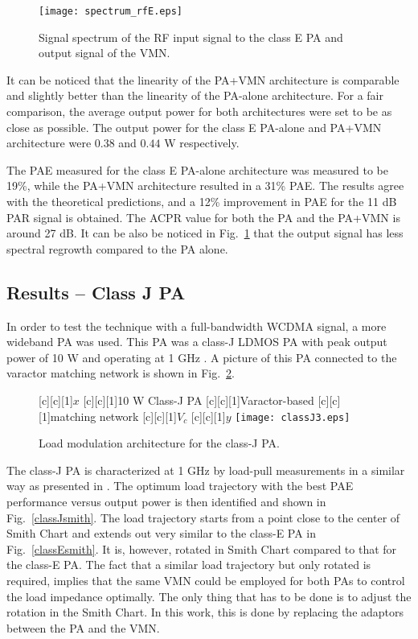 \documentclass[10pt,journal]{IEEEtran}
\begin{document}
\begin{figure}
\centering
\texttt{[image: spectrum\_rfE.eps]}
\caption{Signal spectrum of the RF input signal to the class E PA and output
signal of the VMN.}
\label{spct_rfE}
\end{figure}

It can be noticed that the linearity of the PA+VMN architecture is comparable and slightly better than the linearity of the PA-alone architecture. For a fair comparison, the average output power for both architectures were set to be as close as possible. The output power for the class E PA-alone and PA+VMN architecture were $0.38$ and $0.44$ W respectively.

The PAE measured for the class E PA-alone architecture was measured to be 19\%, while the PA+VMN architecture resulted in a 31\% PAE. The results agree with the theoretical predictions, and a 12\% improvement in PAE for the 11 dB PAR signal is obtained. The ACPR value for both the PA and the PA+VMN is around 27 dB. It can be also be noticed in Fig.~\ref{spct_rfE} that the output signal has less spectral regrowth compared to the PA alone.

\subsection{Results -- Class J PA}
In order to test the technique with a full-bandwidth WCDMA signal, a more wideband PA was used. This PA was a class-J LDMOS PA with peak output power of 10 W and operating at 1 GHz \cite{classJ}. A picture of this PA connected to the varactor matching network is shown in Fig.~\ref{classJ}.

\begin{figure}
\centering
{}[c][c][1]{$x$} [c][c][1]{10 W Class-J PA} [c][c][1]{Varactor-based} [c][c][1]{matching network} [c][c][1]{$V_c$} [c][c][1]{$y$}
\texttt{[image: classJ3.eps]}
\caption{Load modulation architecture for the class-J PA.}
\label{classJ}
\end{figure}

The class-J PA \cite{classJ} is characterized at 1 GHz by load-pull measurements in a similar way as presented in \cite{hosseinMTT,hosseinEMW}. The optimum load trajectory with the best PAE performance versus output power is then identified and shown in Fig.~\ref{classJsmith}. The load trajectory starts from a point close to the center of Smith Chart and extends out very similar to the class-E PA in Fig.~\ref{classEsmith}. It is, however, rotated in Smith Chart compared to that for the class-E PA. The fact that a similar load trajectory but only rotated is required, implies that the same VMN could be employed for both PAs to control the load impedance optimally. The only thing that has to be done is to adjust the rotation in the Smith Chart. In this work, this is done by replacing the adaptors between the PA and the VMN.
\end{document}
